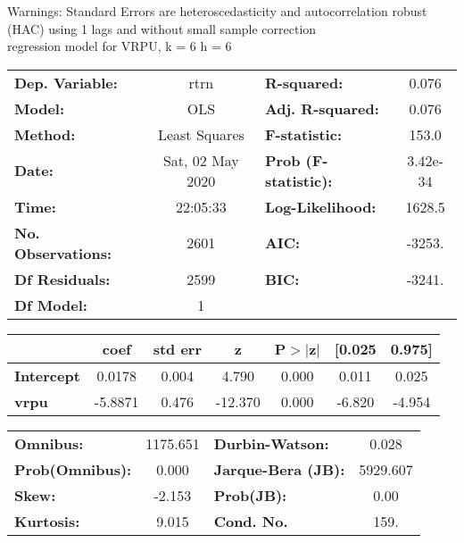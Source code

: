 Warnings: \newline
 [1] Standard Errors are heteroscedasticity and autocorrelation robust (HAC) using 1 lags and without small sample correction\\ 

regression model for VRPU, k = 6 h = 6\begin{center}
\begin{tabular}{lclc}
\toprule
\textbf{Dep. Variable:}    &       rtrn       & \textbf{  R-squared:         } &     0.076   \\
\textbf{Model:}            &       OLS        & \textbf{  Adj. R-squared:    } &     0.076   \\
\textbf{Method:}           &  Least Squares   & \textbf{  F-statistic:       } &     153.0   \\
\textbf{Date:}             & Sat, 02 May 2020 & \textbf{  Prob (F-statistic):} &  3.42e-34   \\
\textbf{Time:}             &     22:05:33     & \textbf{  Log-Likelihood:    } &    1628.5   \\
\textbf{No. Observations:} &        2601      & \textbf{  AIC:               } &    -3253.   \\
\textbf{Df Residuals:}     &        2599      & \textbf{  BIC:               } &    -3241.   \\
\textbf{Df Model:}         &           1      & \textbf{                     } &             \\
\bottomrule
\end{tabular}
\begin{tabular}{lcccccc}
                   & \textbf{coef} & \textbf{std err} & \textbf{z} & \textbf{P$> |$z$|$} & \textbf{[0.025} & \textbf{0.975]}  \\
\midrule
\textbf{Intercept} &       0.0178  &        0.004     &     4.790  &         0.000        &        0.011    &        0.025     \\
\textbf{vrpu}      &      -5.8871  &        0.476     &   -12.370  &         0.000        &       -6.820    &       -4.954     \\
\bottomrule
\end{tabular}
\begin{tabular}{lclc}
\textbf{Omnibus:}       & 1175.651 & \textbf{  Durbin-Watson:     } &    0.028  \\
\textbf{Prob(Omnibus):} &   0.000  & \textbf{  Jarque-Bera (JB):  } & 5929.607  \\
\textbf{Skew:}          &  -2.153  & \textbf{  Prob(JB):          } &     0.00  \\
\textbf{Kurtosis:}      &   9.015  & \textbf{  Cond. No.          } &     159.  \\
\bottomrule
\end{tabular}
\end{center}

